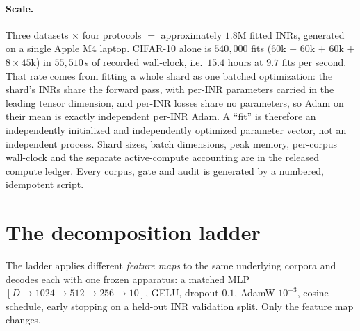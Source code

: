 \documentclass[10pt,letterpaper]{article}
\theoremstyle{definition}
\begin{document}
\paragraph{Scale.} Three datasets $\times$ four protocols $=$ approximately $1.8$M fitted INRs,
generated on a single Apple M4 laptop. CIFAR-10 alone is $540{,}000$ fits ($60$k $+$ $60$k $+$
$60$k $+$ $8\times45$k) in $55{,}510$\,s of recorded wall-clock, i.e.\ $15.4$ hours at $9.7$ fits per
second. That rate comes from fitting a whole shard as one batched optimization: the shard's INRs
share the forward pass, with per-INR parameters carried in the leading tensor dimension, and
per-INR losses share no parameters, so Adam on their mean is exactly independent per-INR Adam. A
``fit'' is therefore an independently initialized and independently optimized parameter vector, not
an independent process. Shard sizes, batch dimensions, peak memory, per-corpus wall-clock and the
separate active-compute accounting are in the released compute ledger. Every corpus, gate and audit
is generated by a numbered, idempotent script.

\section{The decomposition ladder}\label{sec:ladder}

The ladder applies different \emph{feature maps} to the same underlying corpora and decodes each
with one frozen apparatus: a matched MLP $[D \to 1024 \to 512 \to 256 \to 10]$, GELU, dropout
$0.1$, AdamW $10^{-3}$, cosine schedule, early stopping on a held-out INR validation split. Only
the feature map changes.
\end{document}
